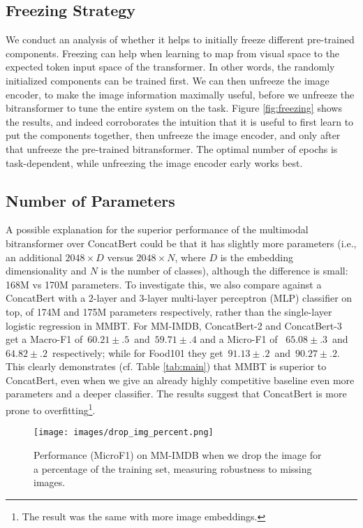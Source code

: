 \documentclass[11pt,a4paper]{article}
\begin{document}
\subsection{Freezing Strategy}
We conduct an analysis of whether it helps to initially freeze different pre-trained components.
Freezing can help when learning to map from visual space to the expected token input space of the transformer. In other words, the randomly initialized components can be trained first.
We can then unfreeze the image encoder, to make the image information maximally useful, before we unfreeze the bitransformer to tune the entire system on the task. Figure \ref{fig:freezing} shows the results, and indeed corroborates the intuition that it is useful to first learn to put the components together, then unfreeze the image encoder, and only after that unfreeze the pre-trained bitransformer. The optimal number of epochs is task-dependent, while unfreezing the image encoder early works best.



\subsection{Number of Parameters} A possible explanation for the superior performance of the multimodal bitransformer over ConcatBert could be that it has slightly more parameters (i.e., an additional $2048\times D$ versus $2048\times N$, where $D$ is the embedding dimensionality and $N$ is the number of classes), although the difference is small: 168M vs 170M parameters. To investigate this, we also compare against a ConcatBert with a $2$-layer and $3$-layer multi-layer perceptron (MLP) classifier on top, of 174M and 175M parameters respectively, rather than the single-layer logistic regression in MMBT. For MM-IMDB, ConcatBert-2 and ConcatBert-3 get a Macro-F1 of~$60.21\pm.5$~and~$59.71\pm.4$ and a Micro-F1 of ~$65.08\pm.3$~and $64.82\pm.2$~respectively; while for Food101 they get~$91.13\pm.2$~and~$90.27\pm.2$. This clearly demonstrates (cf. Table \ref{tab:main}) that MMBT is superior to ConcatBert, even when we give an already highly competitive baseline even more parameters and a deeper classifier. The results suggest that ConcatBert is more prone to overfitting\footnote{The result was the same with more image embeddings.}.







\begin{figure}[t]
    \centering
    \texttt{[image: images/drop\_img\_percent.png]}
    \caption{Performance (MicroF1) on MM-IMDB when we drop the image for a percentage of the training set, measuring robustness to missing images.}
    \label{fig:dropimg}
\end{figure}
\end{document}
